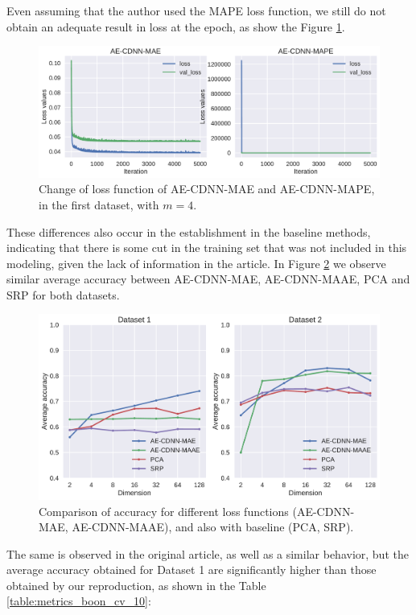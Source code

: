 Even assuming that the author used the MAPE loss function, we still do not obtain an adequate result in loss at the epoch, as show the Figure \ref{fig:change_loss_mae_mape}.

\begin{figure}[!ht]
\centering
\includegraphics[width=0.8\linewidth]{figure/change_loss_mae_mape.pdf}
  \caption{Change of loss function of AE-CDNN-MAE and AE-CDNN-MAPE, in the first dataset, with $m=4$.}
\label{fig:change_loss_mae_mape}
\end{figure}


These differences also occur in the establishment in the baseline methods, indicating that there is some cut in the training set that was not included in this modeling, given the lack of information in the article. In Figure \ref{fig:baseline_methods} we observe similar average accuracy between AE-CDNN-MAE, AE-CDNN-MAAE, PCA and SRP for both datasets. 


\begin{figure}[!ht]
\centering
\includegraphics[width=\linewidth]{figure/baseline_methods.pdf}
  \caption{Comparison of accuracy for different loss functions (AE-CDNN-MAE, AE-CDNN-MAAE), and also with baseline (PCA, SRP).}
\label{fig:baseline_methods}
\end{figure}

The same is observed in the original article, as well as a similar behavior, but the average accuracy obtained for Dataset 1 are significantly higher than those obtained by our reproduction, as shown in the Table \ref{table:metrics_boon_cv_10}:

